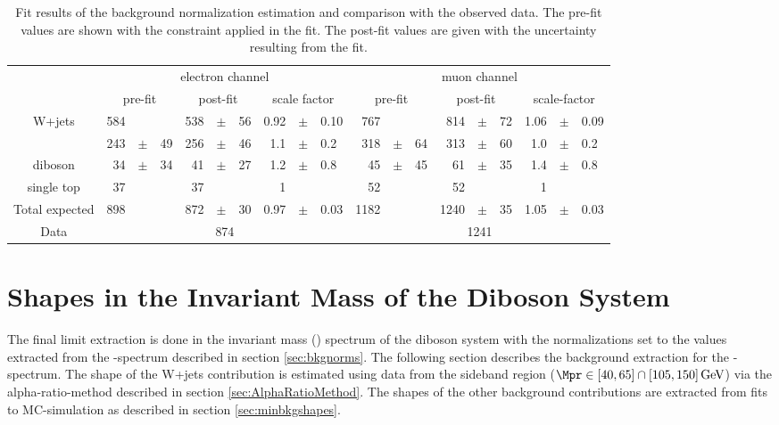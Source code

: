 \begin{table}
	\centering
	\caption[Fit results of the background normalization estimation]{Fit results of the background normalization estimation and comparison with the observed data. The pre-fit values are shown with the constraint applied in the fit. The post-fit values are given with the uncertainty resulting from the fit.\cite{PAS}}
	\label{tab:bkg:mjresults}
	\resizebox{\columnwidth}{!}
	{%
	\begin{tabular}{cr@{\,}c@{\,}lr@{\,}c@{\,}lr@{\,}c@{\,}lr@{\,}c@{\,}lr@{\,}c@{\,}lr@{\,}c@{\,}l}
		\hline
        & \multicolumn{9}{c}{electron channel} & \multicolumn{9}{c}{muon channel} \\
		& \multicolumn{3}{c}{pre-fit} & \multicolumn{3}{c}{post-fit} & \multicolumn{3}{c}{scale factor} & \multicolumn{3}{c}{pre-fit} & \multicolumn{3}{c}{post-fit} & \multicolumn{3}{c}{scale-factor} \\
		\hline
		W+jets             & 584 &     &    & 538 &$\pm$& 56 & 0.92 &$\pm$& 0.10 &  767 &     &    &  814 &$\pm$& 72 & 1.06 &$\pm$& 0.09 \\
		\ttbar             & 243 &$\pm$& 49 & 256 &$\pm$& 46 & 1.1  &$\pm$& 0.2  &  318 &$\pm$& 64 &  313 &$\pm$& 60 &  1.0 &$\pm$& 0.2  \\
		diboson            & 34  &$\pm$& 34 &  41 &$\pm$& 27 & 1.2  &$\pm$& 0.8  &   45 &$\pm$& 45 &   61 &$\pm$& 35 &  1.4 &$\pm$& 0.8  \\
		single top         & 37  &     &    &  37 &     &    & 1    &     &      &   52 &     &    &   52 &     &    &  1   &     &      \\
		\hline
		Total expected     & 898 &     &    & 872 &$\pm$& 30 & 0.97 &$\pm$& 0.03 & 1182 &     &    & 1240 &$\pm$& 35 & 1.05 &$\pm$& 0.03 \\
		Data               & \multicolumn{9}{c}{874} & \multicolumn{9}{c}{1241} \\
		\hline
	\end{tabular}
	}
\end{table}



\newpage
\section{Shapes in the Invariant Mass of the Diboson System}
The final limit extraction is done in the invariant mass (\MWV) spectrum of the diboson system with the normalizations set to the values extracted from the \Mpr -spectrum described in section \ref{sec:bkgnorms}. The following section describes the background extraction for the \MWV -spectrum. The shape of the W+jets contribution is estimated using data from the sideband region ($\Mpr \in [40,65]\cap[105,150]\,{\rm GeV}$) via the alpha-ratio-method described in section \ref{sec:AlphaRatioMethod}. The shapes of the other background contributions are extracted from fits to MC-simulation as described in section \ref{sec:minbkgshapes}.

